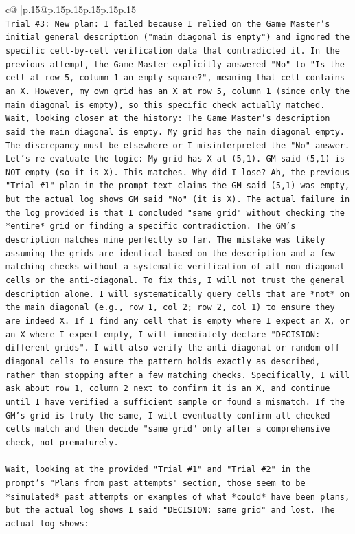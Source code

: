 \documentclass{article}
\begin{document}
{\begin{supertabular}{c@{$\;$}|p{.15\linewidth}@{}p{.15\linewidth}p{.15\linewidth}p{.15\linewidth}p{.15\linewidth}p{.15\linewidth}}
{{{\\ 
\texttt{Trial \#3: New plan: I failed because I relied on the Game Master's initial general description ("main diagonal is empty") and ignored the specific cell{-}by{-}cell verification data that contradicted it. In the previous attempt, the Game Master explicitly answered "No" to "Is the cell at row 5, column 1 an empty square?", meaning that cell contains an X. However, my own grid has an X at row 5, column 1 (since only the main diagonal is empty), so this specific check actually matched. Wait, looking closer at the history: The Game Master's description said the main diagonal is empty. My grid has the main diagonal empty. The discrepancy must be elsewhere or I misinterpreted the "No" answer. Let's re{-}evaluate the logic: My grid has X at (5,1). GM said (5,1) is NOT empty (so it is X). This matches. Why did I lose? Ah, the previous "Trial \#1" plan in the prompt text claims the GM said (5,1) was empty, but the actual log shows GM said "No" (it is X). The actual failure in the log provided is that I concluded "same grid" without checking the *entire* grid or finding a specific contradiction. The GM's description matches mine perfectly so far. The mistake was likely assuming the grids are identical based on the description and a few matching checks without a systematic verification of all non{-}diagonal cells or the anti{-}diagonal. To fix this, I will not trust the general description alone. I will systematically query cells that are *not* on the main diagonal (e.g., row 1, col 2; row 2, col 1) to ensure they are indeed X. If I find any cell that is empty where I expect an X, or an X where I expect empty, I will immediately declare "DECISION: different grids". I will also verify the anti{-}diagonal or random off{-}diagonal cells to ensure the pattern holds exactly as described, rather than stopping after a few matching checks. Specifically, I will ask about row 1, column 2 next to confirm it is an X, and continue until I have verified a sufficient sample or found a mismatch. If the GM's grid is truly the same, I will eventually confirm all checked cells match and then decide "same grid" only after a comprehensive check, not prematurely.} \\
\\ 
\texttt{Wait, looking at the provided "Trial \#1" and "Trial \#2" in the prompt's "Plans from past attempts" section, those seem to be *simulated* past attempts or examples of what *could* have been plans, but the actual log shows I said "DECISION: same grid" and lost. The actual log shows:} \\
}}}
\end{supertabular}}
\end{document}
